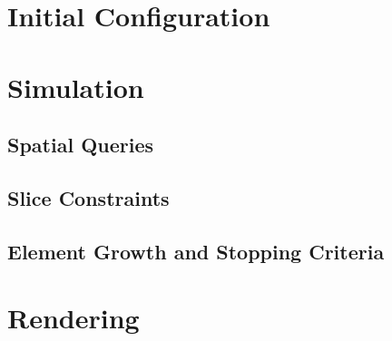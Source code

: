\section{Initial Configuration}
\label{animationpak_}


\section{Simulation}
\label{animationpak_}


\subsection{Spatial Queries}
\label{animationpak_}


\subsection{Slice Constraints}
\label{animationpak_}


\subsection{Element Growth and Stopping Criteria}
\label{animationpak_}


\section{Rendering}
\label{animationpak_}


